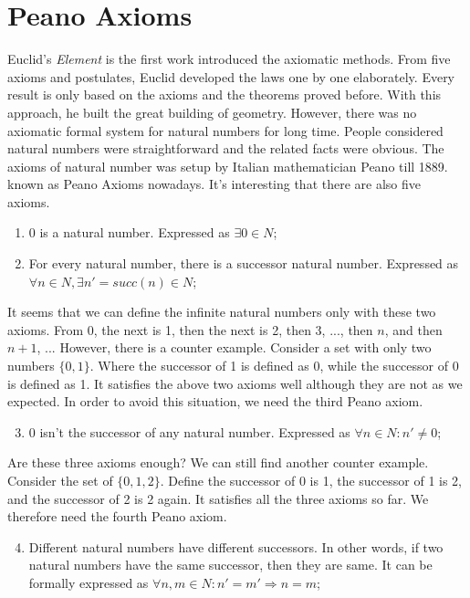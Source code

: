 \documentclass[UTF8]{article}
\begin{document}
\section{Peano Axioms}

Euclid's {\em Element} is the first work introduced the axiomatic methods. From five axioms and postulates, Euclid developed the laws one by one elaborately. Every result is only based on the axioms and the theorems proved before. With this approach, he built the great building of geometry. However, there was no axiomatic formal system for natural numbers for long time. People considered natural numbers were straightforward and the related facts were obvious. The axioms of natural number was setup by Italian mathematician Peano till 1889. known as Peano Axioms nowadays. It's interesting that there are also five axioms.

\begin{enumerate}
\item 0 is a natural number. Expressed as $\exists 0 \in N$;
\item For every natural number, there is a successor natural number. Expressed as $\forall n \in N, \exists n' = succ(n) \in N$;
\end{enumerate}

It seems that we can define the infinite natural numbers only with these two axioms. From 0, the next is 1, then the next is 2, then 3, ..., then $n$, and then $n+1$, ... However, there is a counter example. Consider a set with only two numbers $\{0, 1\}$. Where the successor of 1 is defined as 0, while the successor of 0 is defined as 1. It satisfies the above two axioms well although they are not as we expected. In order to avoid this situation, we need the third Peano axiom.

\begin{enumerate}
  \setcounter{enumi}{2}
  \item 0 isn't the successor of any natural number. Expressed as $\forall n \in N: n' \neq 0$;
\end{enumerate}

Are these three axioms enough? We can still find another counter example. Consider the set of $\{0, 1, 2\}$. Define the successor of 0 is 1, the successor of 1 is 2, and the successor of 2 is 2 again. It satisfies all the three axioms so far. We therefore need the fourth Peano axiom.

\begin{enumerate}
  \setcounter{enumi}{3}
  \item Different natural numbers have different successors. In other words, if two natural numbers have the same successor, then they are same. It can be formally expressed as $\forall n, m \in N: n' = m' \Rightarrow n = m$;
\end{enumerate}
\end{document}
